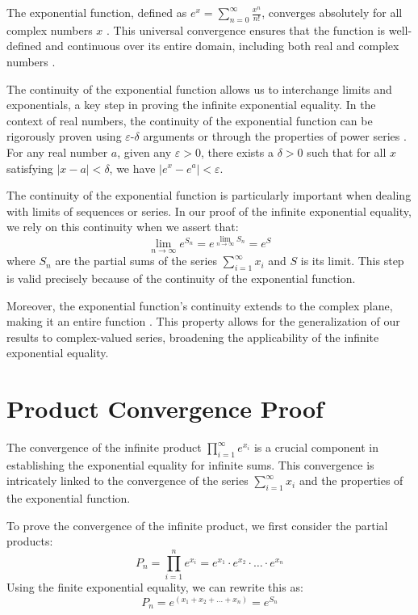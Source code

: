 \documentclass{article}
\begin{document}
The exponential function, defined as $e^x = \sum_{n=0}^\infty \frac{x^n}{n!}$, converges absolutely for all complex numbers $x$ \cite{source1}. This universal convergence ensures that the function is well-defined and continuous over its entire domain, including both real and complex numbers \cite{source2}.

The continuity of the exponential function allows us to interchange limits and exponentials, a key step in proving the infinite exponential equality. In the context of real numbers, the continuity of the exponential function can be rigorously proven using $\varepsilon$-$\delta$ arguments or through the properties of power series \cite{source3}. For any real number $a$, given any $\varepsilon > 0$, there exists a $\delta > 0$ such that for all $x$ satisfying $|x-a| < \delta$, we have $|e^x - e^a| < \varepsilon$.

The continuity of the exponential function is particularly important when dealing with limits of sequences or series. In our proof of the infinite exponential equality, we rely on this continuity when we assert that:
\[
\lim_{n\to \infty} e^{S_n} = e^{\lim_{n\to \infty} S_n} = e^S
\]
where $S_n$ are the partial sums of the series $\sum_{i=1}^\infty x_i$ and $S$ is its limit. This step is valid precisely because of the continuity of the exponential function.

Moreover, the exponential function's continuity extends to the complex plane, making it an entire function \cite{source2}. This property allows for the generalization of our results to complex-valued series, broadening the applicability of the infinite exponential equality.

\section*{Product Convergence Proof}

The convergence of the infinite product $\prod_{i=1}^\infty e^{x_i}$ is a crucial component in establishing the exponential equality for infinite sums. This convergence is intricately linked to the convergence of the series $\sum_{i=1}^\infty x_i$ and the properties of the exponential function.

To prove the convergence of the infinite product, we first consider the partial products:
\[
P_n = \prod_{i=1}^n e^{x_i} = e^{x_1} \cdot e^{x_2} \cdot \dots \cdot e^{x_n}
\]
Using the finite exponential equality, we can rewrite this as:
\[
P_n = e^{(x_1+x_2+\dots+x_n)} = e^{S_n}
\]
\end{document}
